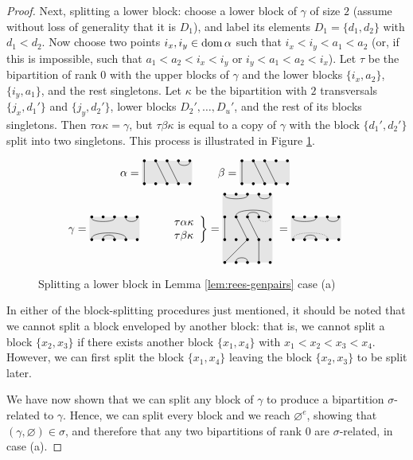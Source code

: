 \begin{lemma}
\begin{proof}
    Next, splitting a lower block: choose a lower block of $\gamma$ of size $2$
    (assume without loss of generality that it is $D_1$), and label its elements
    $D_1 = \{d_1, d_2\}$ with $d_1 < d_2$.  Now choose two points
    $i_x, i_y \in \operatorname{dom}\alpha$ such that $i_x < i_y < a_1 < a_2$ (or, if this is
    impossible, such that $a_1 < a_2 < i_x < i_y$ or $i_y < a_1 < a_2 < i_x$).
    Let $\tau$ be the bipartition of rank $0$ with the upper blocks of $\gamma$
    and the lower blocks $\{i_x, a_2\}$, $\{i_y, a_1\}$, and the rest
    singletons.  Let $\kappa$ be the bipartition with $2$ transversals
    $\{j_x, d_1'\}$ and $\{j_y, d_2'\}$, lower blocks $D_2', \ldots, D_u'$, and
    the rest of its blocks singletons.  Then $\tau\alpha\kappa = \gamma$, but
    $\tau\beta\kappa$ is equal to a copy of $\gamma$ with the block
    $\{d_1', d_2'\}$ split into two singletons.  This process is illustrated in
    Figure \ref{fig:case-a-r0-example-lower}.

    \begin{figure}[h]
      \centering
      $$
      \alpha = \bipartdiag{\tv11 \tv23 \tv34 \tc45} \qquad
      \beta = \bipartdiag{\tv11 \tv23 \tv34}
      $$
      $$
      \gamma = \bipartdiag{\tc13 \tc45 \bC14 \bc23} \qquad
      \left.
        \begin{array}{l}\tau\alpha\kappa\\ \tau\beta\kappa \end{array}
      \right\} = \triplebipartdiag{
        \uutc13 \uutc45 \uubC25 \uubc34
        \utv11 \utv23 \utv34
        \draw[densely dotted](5, 3.875)
        .. controls (5, 3.5) and (4, 3.5)
        .. (4, 3.875);
        \tv31 \bc23 \tv44
      } = \bipartdiag{\tc13 \tc45 \bc23
        \draw[densely dotted](1, 0.125)
        .. controls (1, 0.75) and (4, 0.75)
        .. (4, 0.125);
      }
      $$
      \caption{Splitting a lower block in Lemma \ref{lem:rees-genpairs} case
        (a)}
      \label{fig:case-a-r0-example-lower}
    \end{figure}

    In either of the block-splitting procedures just mentioned, it should be
    noted that we cannot split a block enveloped by another block: that is, we
    cannot split a block $\{x_2, x_3\}$ if there exists another block
    $\{x_1, x_4\}$ with $x_1 < x_2 < x_3 < x_4$.  However, we can first split
    the block $\{x_1, x_4\}$ leaving the block $\{x_2, x_3\}$ to be split later.

    We have now shown that we can split any block of $\gamma$ to produce a
    bipartition $\sigma$-related to $\gamma$.  Hence, we can split every block
    and we reach $\varnothing^e$, showing that
    $(\gamma, \varnothing) \in \sigma$, and therefore that any two bipartitions
    of rank 0 are $\sigma$-related, in case (a).


\end{proof}
\end{lemma}
